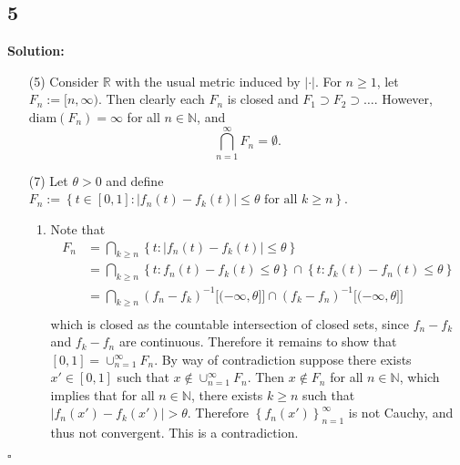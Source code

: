 \documentclass[12pt]{article}
\newcounter{ProofCounter}
\newenvironment{Solution}{\stepcounter{ProofCounter}\textbf{Solution:}}{\hfill$\square$}
\begin{document}
\subsection*{5}
\begin{Solution}
  \begin{enumerate}
    \item[(5)] Consider $\mathbb{R}$ with the usual metric induced by $|\cdot|$. For $n\geq 1$, let $F_n := [n, \infty)$. Then clearly each $F_n$ is
      closed and $F_1 \supset F_2 \supset \dots$. However, $\text{diam}(F_n) = \infty$ for all $n \in \mathbb{N}$, and 
      \[
        \bigcap_{n=1}^{\infty}F_{n} = \emptyset.
      \]

    \item[(7)] Let $\theta > 0$ and define $F_n := \left\{ t \in [0,1]: |f_n(t) - f_k(t)| \leq \theta \text{ for all } k \geq n \right\}$.
      \begin{enumerate}
        \item Note that 
          \begin{align*}
            F_n & = \bigcap_{k\geq n}\left\{ t : |f_n(t) - f_k(t)| \leq \theta \right\}\\
            & = \bigcap_{k\geq n}\left\{ t : f_n(t) - f_k(t)\leq \theta \right\} \cap \left\{ t : f_k(t) - f_n(t) \leq \theta \right\}\\
            & = \bigcap_{k\geq n}(f_n - f_k)^{-1}\big[(-\infty,\theta]\big] \cap  (f_k - f_n)^{-1}\big[(-\infty,\theta]\big] \\
          \end{align*}
          which is closed as the countable intersection of closed sets, since $f_n - f_k$ and $f_k - f_n$ are continuous. Therefore it remains to show
          that $[0,1] = \cup_{n=1}^{\infty}F_n$. By way of contradiction suppose there exists $x' \in [0,1]$ such that $x \notin
          \cup_{n=1}^{\infty}F_n$. Then $x \notin F_n$ for all $n \in \mathbb{N}$, which implies that for all $n \in \mathbb{N}$, there exists $k \geq
          n$ such that $|f_n(x') - f_k(x')| > \theta$. Therefore $\left\{ f_n(x') \right\}_{n=1}^{\infty}$ is not Cauchy, and thus not convergent.
          This is a contradiction.


\end{enumerate}
\end{enumerate}
\end{Solution}
\end{document}
